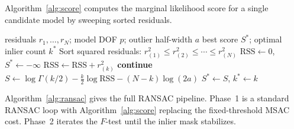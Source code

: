 \documentclass[11pt]{article}
\begin{document}
\medskip

Algorithm~\ref{alg:score} computes the marginal likelihood score for a
single candidate model by sweeping sorted residuals.

\begin{algorithm}[ht]
\caption{Marginal likelihood model score}
\label{alg:score}
\begin{algorithmic}[1]
\Require residuals $r_1, \ldots, r_N$; model DOF $p$; outlier half-width $a$
\Ensure best score $S^*$; optimal inlier count $k^*$
\State Sort squared residuals: $r^2_{(1)} \le r^2_{(2)} \le \cdots \le r^2_{(N)}$
\State $\mathrm{RSS} \gets 0$, \quad $S^* \gets -\infty$
  \State $\mathrm{RSS} \gets \mathrm{RSS} + r^2_{(k)}$
   \textbf{continue} 
  \EndIf
  \State $S \gets \log\Gamma(k/2) - \tfrac{k}{2}\log\mathrm{RSS} - (N-k)\log(2a)$
    \State $S^* \gets S$, \quad $k^* \gets k$
  \EndIf
\EndFor
\end{algorithmic}
\end{algorithm}

Algorithm~\ref{alg:ransac} gives the full RANSAC pipeline.  Phase~1 is
a standard RANSAC loop with Algorithm~\ref{alg:score} replacing the
fixed-threshold MSAC cost.  Phase~2 iterates the $F$-test until the
inlier mask stabilizes.
\end{document}
